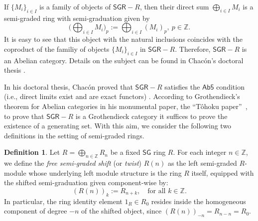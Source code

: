 \documentclass[reqno]{amsart}
\theoremstyle{definition}
\newtheorem{definition}[theorem]{Definition}
\theoremstyle{remark}
\numberwithin{equation}{section}
\begin{document}
If $\{M_i\}_{i\in I}$ is a family of objects of $\mathsf{SGR}-R$, then their direct sum $\bigoplus_{i\in I} M_i$ is a semi-graded ring with semi-graduation given by
\[
\biggl(\bigoplus_{i\in I} M_i\biggr)_p := \bigoplus_{i\in I}(M_i)_p, \ p\in\mathbb{Z}.
\]
It is easy to see that this object with the natural inclusions coincides with the coproduct of the familiy of objects $\{M_i\}_{i\in I}$ in $\mathsf{SGR}-R$. Therefore, $\mathsf{SGR}-R$ is an Abelian category. Details on the subject can be found in Chac\'on's doctoral thesis \cite{ChaconPhDThesis2022}.


In his doctoral thesis, Chac\'on proved that $\mathsf{SGR}-R$ satisfies the $\mathsf{Ab5}$ condition (i.e., direct limits exist and are exact functors) \cite[Section 1.5]{ChaconPhDThesis2022}. According to Grothendieck's theorem for Abelian categories in his monumental paper, the \textquotedblleft T{\^o}hoku paper\textquotedblright\ \cite[Théorème 1.10.1.]{Grothendieck1957}, to prove that $\mathsf{SGR}-R$ is a Grothendieck category it suffices to prove the existence of a generating set. With this aim, we consider the following two definitions in the setting of semi-graded rings. 

\begin{definition}\label{def.freeshifts}
Let $R = \bigoplus_{n \in \mathbb{Z}} R_n$ be a fixed $\mathsf{SG}$ ring $R$. For each integer $n \in \mathbb{Z}$, we define the {\em free semi-graded shift} (or {\em twist}) $R(n)$ as the left semi-graded $R$-module whose underlying left module structure is the ring $R$ itself, equipped with the shifted semi-graduation given component-wise by:
\[
(R(n))_k := R_{n + k}, \quad \text{for all } k \in \mathbb{Z}.
\]
In particular, the ring identity element $1_R \in R_0$ resides inside the homogeneous component of degree $-n$ of the shifted object, since $(R(n))_{-n} = R_{n-n} = R_0$.
\end{definition}
\end{document}
